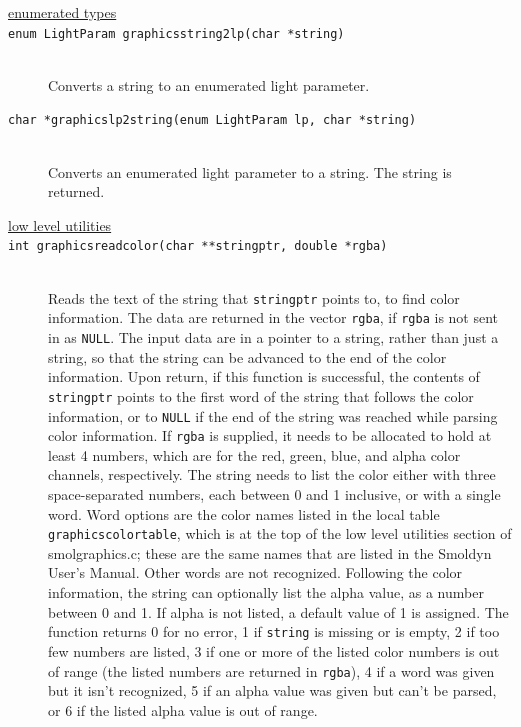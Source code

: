 \documentclass {scrbook}
\newcommand {\ttt} {\texttt}
\begin{document}
\begin{description}

\item[\underline{enumerated types}]

\item[\ttt{enum LightParam graphicsstring2lp(char *string)}]
\hfill \\
Converts a string to an enumerated light parameter.

\item[\ttt{char *graphicslp2string(enum LightParam lp, char *string)}]
\hfill \\
Converts an enumerated light parameter to a string. The string is returned.

\item[\underline{low level utilities}]

\item[\ttt{int graphicsreadcolor(char **stringptr, double *rgba)}]
\hfill \\
Reads the text of the string that \ttt{stringptr} points to, to find color information. The data are returned in the vector \ttt{rgba}, if \ttt{rgba} is not sent in as \ttt{NULL}. The input data are in a pointer to a string, rather than just a string, so that the string can be advanced to the end of the color information. Upon return, if this function is successful, the contents of \ttt{stringptr} points to the first word of the string that follows the color information, or to \ttt{NULL} if the end of the string was reached while parsing color information. If \ttt{rgba} is supplied, it needs to be allocated to hold at least 4 numbers, which are for the red, green, blue, and alpha color channels, respectively. The string needs to list the color either with three space-separated numbers, each between 0 and 1 inclusive, or with a single word. Word options are the color names listed in the local table \ttt{graphicscolortable}, which is at the top of the low level utilities section of smolgraphics.c; these are the same names that are listed in the Smoldyn User's Manual. Other words are not recognized. Following the color information, the string can optionally list the alpha value, as a number between 0 and 1. If alpha is not listed, a default value of 1 is assigned. The function returns 0 for no error, 1 if \ttt{string} is missing or is empty, 2 if too few numbers are listed, 3 if one or more of the listed color numbers is out of range (the listed numbers are returned in \ttt{rgba}), 4 if a word was given but it isn't recognized, 5 if an alpha value was given but can't be parsed, or 6 if the listed alpha value is out of range.


\end{description}
\end{document}
